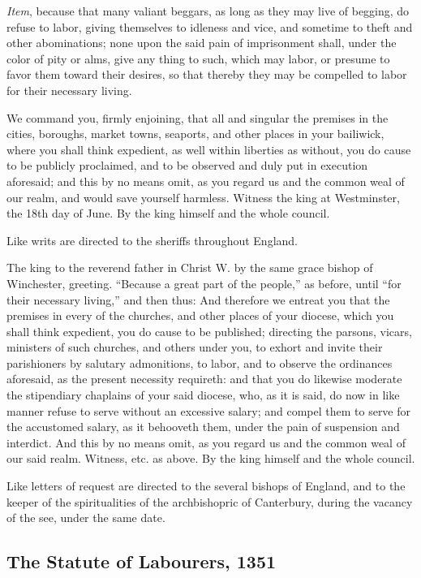 \documentclass[
  letterpaper,
  11pt,
  DIV=9,
  openright]{scrbook}
\begin{document}
\emph{Item}, because that many valiant beggars, as long as they may live
of begging, do refuse to labor, giving themselves to idleness and vice,
and sometime to theft and other abominations; none upon the said pain of
imprisonment shall, under the color of pity or alms, give any thing to
such, which may labor, or presume to favor them toward their desires, so
that thereby they may be compelled to labor for their necessary living.

We command you, firmly enjoining, that all and singular the premises in
the cities, boroughs, market towns, seaports, and other places in your
bailiwick, where you shall think expedient, as well within liberties as
without, you do cause to be publicly proclaimed, and to be observed and
duly put in execution aforesaid; and this by no means omit, as you
regard us and the common weal of our realm, and would save yourself
harmless. Witness the king at Westminster, the 18th day of June. By the
king himself and the whole council.

Like writs are directed to the sheriffs throughout England.

The king to the reverend father in Christ W. by the same grace bishop of
Winchester, greeting. ``Because a great part of the people,'' as before,
until ``for their necessary living,'' and then thus: And therefore we
entreat you that the premises in every of the churches, and other places
of your diocese, which you shall think expedient, you do cause to be
published; directing the parsons, vicars, ministers of such churches,
and others under you, to exhort and invite their parishioners by
salutary admonitions, to labor, and to observe the ordinances aforesaid,
as the present necessity requireth: and that you do likewise moderate
the stipendiary chaplains of your said diocese, who, as it is said, do
now in like manner refuse to serve without an excessive salary; and
compel them to serve for the accustomed salary, as it behooveth them,
under the pain of suspension and interdict. And this by no means omit,
as you regard us and the common weal of our said realm. Witness, etc. as
above. By the king himself and the whole council.

Like letters of request are directed to the several bishops of England,
and to the keeper of the spiritualities of the archbishopric of
Canterbury, during the vacancy of the see, under the same date.

\subsection{The Statute of Labourers,
1351}\label{the-statute-of-labourers-1351}
\end{document}
